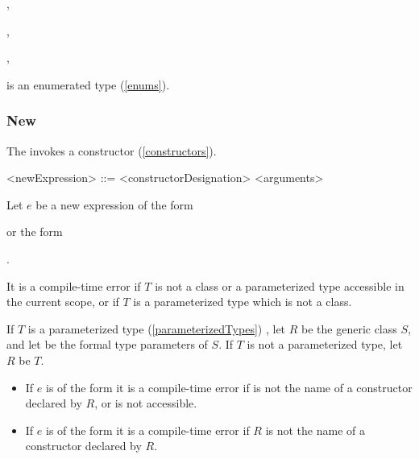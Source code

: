 \documentclass[makeidx]{article}
\begin{document}
{\noindent
{},

\noindent
{},

\noindent
{},

\noindent
{}

\noindent
is an enumerated type (\ref{enums}).


\subsubsection{New}

\LMHash{}%
The  invokes a constructor (\ref{constructors}).

\begin{grammar}
<newExpression> ::= \NEW{} <constructorDesignation> <arguments>
\end{grammar}

\LMHash{}%
Let $e$ be a new expression of the form

\noindent
{}
or the form

\noindent
{}.

\LMHash{}%
It is a compile-time error if $T$ is not
a class or a parameterized type accessible in the current scope,
or if $T$ is a parameterized type which is not a class.

\LMHash{}%
If $T$ is a parameterized type (\ref{parameterizedTypes})
,
let $R$ be the generic class $S$,
and let
be the formal type parameters of $S$.
If $T$ is not a parameterized type, let $R$ be $T$.

\begin{itemize}
\item
  If $e$ is of the form
  it is a compile-time error if  is not the name of
  a constructor declared by $R$, or \id{} is not accessible.
\item
  If $e$ is of the form
  it is a compile-time error if $R$ is not the name of
  a constructor declared by $R$.
\end{itemize}

}
\end{document}
